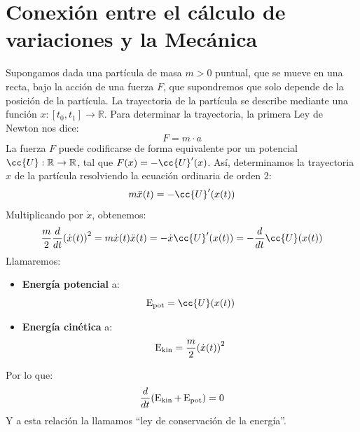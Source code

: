 \section{Conexión entre el cálculo de variaciones y la Mecánica}
\noindent
Supongamos dada una partícula de masa $m>0$ puntual, que se mueve en una recta, bajo la acción de una fuerza $F$, que supondremos que solo depende de la posición de la partícula. La trayectoria de la partícula se describe mediante una función $x:[t_0,t_1]\to \mathbb{R}$. Para determinar la trayectoria, la primera Ley de Newton nos dice:
\begin{equation*}
    F = m\cdot a
\end{equation*}
La fuerza $F$ puede codificarse de forma equivalente por un potencial $\cc{U}:\mathbb{R}\to \mathbb{R}$, tal que $F(x) = -\cc{U}'(x)$. Así, determinamos la trayectoria $x$ de la partícula resolviendo la ecuación ordinaria de orden 2:
\begin{equation*}
    m\ddot{x}(t) = -\cc{U}'(x(t))
\end{equation*}
Multiplicando por $\dot{x}$, obtenemos:
\begin{equation*}
    \frac{m}{2} \frac{d}{dt}{\left(\dot{x}(t)\right)}^{2} = m\dot{x}(t)\ddot{x}(t) = -\dot{x}\cc{U}'(x(t)) = -\frac{d}{dt}\cc{U}(x(t))
\end{equation*}
Llamaremos:
\begin{itemize}
    \item \textbf{Energía potencial} a:
        \begin{equation*}
            \Epot = \cc{U}(x(t))
        \end{equation*}
    \item \textbf{Energía cinética} a:
        \begin{equation*}
            \operatorname{\text{E}_{\text{kin}}} = \frac{m}{2}{(\dot{x}(t))}^{2}
        \end{equation*}
\end{itemize}
Por lo que:
\begin{equation*}
    \frac{d}{dt}(\operatorname{\text{E}_{\text{kin}}} + \operatorname{\text{E}_{\text{pot}}}) = 0
\end{equation*}
Y a esta relación la llamamos ``ley de conservación de la energía''.\\

